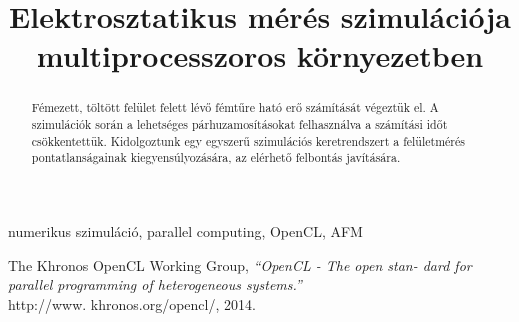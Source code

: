 \documentclass[10pt,conference]{IEEEtran}
\begin{document}
	\title{Elektrosztatikus mérés szimulációja multiprocesszoros környezetben}
	
	\author{
		  
		\and
		 
	}
	
	\maketitle

	\begin{abstract}
	 Fémezett, töltött felület felett lévő fémtűre ható erő számítását végeztük el.
	 A szimulációk során a lehetséges párhuzamosításokat felhasználva a számítási időt csökkentettük.
	 Kidolgoztunk egy egyszerű szimulációs keretrendszert a felületmérés pontatlanságainak kiegyensúlyozására, az elérhető felbontás javítására.
	\end{abstract}

	\begin{IEEEkeywords}
	 numerikus szimuláció, parallel computing, OpenCL, AFM 
	\end{IEEEkeywords}

	
	
	
	
	
	
	
	
	
	
	
	\begin{thebibliography}{1}
	
	The Khronos OpenCL Working Group, \emph{“OpenCL - The open stan-
	dard for parallel programming of heterogeneous systems.”} \\http://www.
	khronos.org/opencl/, 2014.
	
	
	
	\end{thebibliography}
	
\end{document}
